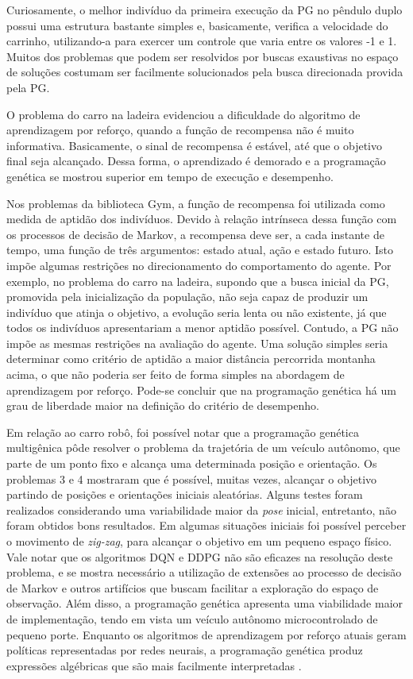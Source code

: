 Curiosamente, o melhor indivíduo da primeira execução da PG no pêndulo duplo possui uma estrutura bastante simples e, basicamente, verifica a velocidade do carrinho, utilizando-a para exercer um controle que varia entre os valores -1 e 1. Muitos dos problemas que podem ser resolvidos por buscas exaustivas no espaço de soluções costumam ser facilmente solucionados pela busca direcionada provida pela PG.

O problema do carro na ladeira evidenciou a dificuldade do algoritmo de aprendizagem por reforço, quando a função de recompensa não é muito informativa. Basicamente, o sinal de recompensa é estável, até que o objetivo final seja alcançado. Dessa forma, o aprendizado é demorado e a programação genética se mostrou superior em tempo de execução e desempenho.

Nos problemas da biblioteca Gym, a função de recompensa foi utilizada como medida de aptidão dos indivíduos. Devido à relação intrínseca dessa função com os processos de decisão de Markov, a recompensa deve ser, a cada instante de tempo, uma função de três argumentos: estado atual, ação e estado futuro. Isto impõe algumas restrições no direcionamento do comportamento do agente. Por exemplo, no problema do carro na ladeira, supondo que a busca inicial da PG, promovida pela inicialização da população, não seja capaz de produzir um indivíduo que atinja o objetivo, a evolução seria lenta ou não existente, já que todos os indivíduos apresentariam a menor aptidão possível. Contudo, a PG não impõe as mesmas restrições na avaliação do agente. Uma solução simples seria determinar como critério de aptidão a maior distância percorrida montanha acima, o que não poderia ser feito de forma simples na abordagem de aprendizagem por reforço. Pode-se concluir que na programação genética há um grau de liberdade maior na definição do critério de desempenho.

Em relação ao carro robô, foi possível notar que a programação genética multigênica pôde resolver o problema da trajetória de um veículo autônomo, que parte de um ponto fixo e alcança uma determinada posição e orientação. Os problemas 3 e 4 mostraram que é possível, muitas vezes, alcançar o objetivo partindo de posições e orientações iniciais aleatórias. Alguns testes foram realizados considerando uma variabilidade maior da \textit{pose} inicial, entretanto, não foram obtidos bons resultados. Em algumas situações iniciais foi possível perceber o movimento de \textit{zig-zag}, para alcançar o objetivo em um pequeno espaço físico. Vale notar que os algoritmos DQN e DDPG não são eficazes na resolução deste problema, e se mostra necessário a utilização de extensões ao processo de decisão de Markov e outros artifícios que buscam facilitar a exploração do espaço de observação. Além disso, a programação genética apresenta uma viabilidade maior de implementação, tendo em vista um veículo autônomo microcontrolado de pequeno porte. Enquanto os algoritmos de aprendizagem por reforço atuais geram políticas representadas por redes neurais, a programação genética produz expressões algébricas que são mais facilmente interpretadas \cite{politica}.

